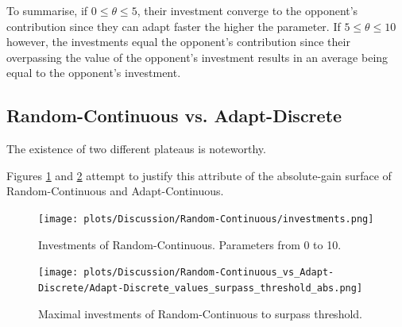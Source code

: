 \documentclass[11pt]{article}
\begin{document}
	To summarise, if $0 \le \theta \le 5$, their investment converge to the opponent's contribution since they can adapt faster the higher the parameter.
	If $5 \le \theta \le 10$ however, the investments equal the opponent's contribution since their overpassing the value of the opponent's investment results in an average being equal to the opponent's investment.\\
\subsection{Random-Continuous vs. Adapt-Discrete}
	The existence of two different plateaus is noteworthy.
	
	Figures \ref{fig:RndC_investm} and \ref{fig:AdpD_surpass_threshold_infl_RndC} attempt to justify this attribute of the absolute-gain surface of Random-Continuous and Adapt-Continuous.
	\begin{figure}[h]
		\begin{center}
			\texttt{[image: plots/Discussion/Random-Continuous/investments.png]}
		\end{center}
		\caption{Investments of Random-Continuous. Parameters from 0 to 10.}
		\label{fig:RndC_investm}
	\end{figure}
	\begin{figure}[h]
		\begin{center}
			\texttt{[image: plots/Discussion/Random-Continuous\_vs\_Adapt-Discrete/Adapt-Discrete\_values\_surpass\_threshold\_abs.png]}\\
		\end{center}
		\caption{Maximal investments of Random-Continuous to surpass threshold.}
		\label{fig:AdpD_surpass_threshold_infl_RndC}
	\end{figure}
	
\end{document}
